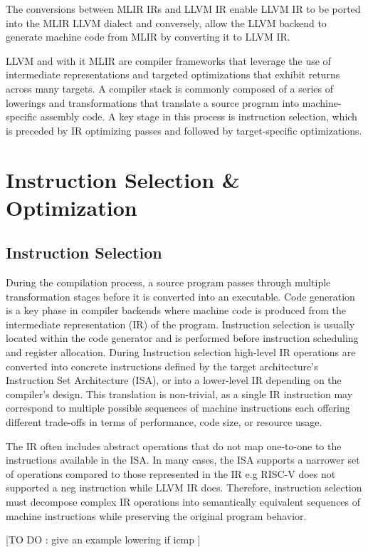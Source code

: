 The conversions between MLIR IRs and LLVM IR enable LLVM IR to be ported into the MLIR LLVM dialect and conversely, allow the LLVM backend to generate machine code from MLIR by converting it to LLVM IR.

LLVM and with it MLIR are compiler frameworks that leverage the use of intermediate representations and targeted optimizations that exhibit returns across many targets.  A compiler stack is commonly composed of a series of lowerings and transformations that translate a source program into machine-specific assembly code. A key stage in this process is instruction selection, which is preceded by IR optimizing passes and followed by target-specific optimizations. 

\section{Instruction Selection \& Optimization}
\subsection {Instruction Selection}
During the compilation process, a source program passes through multiple transformation stages before it is converted into an executable. Code generation is a key phase in compiler backends where machine code is produced from the intermediate representation (IR) of the program. Instruction selection is usually located within the code generator and is performed before instruction scheduling and register allocation. During Instruction selection high-level IR operations are converted into concrete instructions defined by the target architecture’s Instruction Set Architecture (ISA), or into a lower-level IR depending on the compiler's design.
 This translation is non-trivial, as a single IR instruction may correspond to multiple possible sequences of machine instructions each offering different trade-offs in terms
of performance, code size, or resource usage. 

The IR often includes abstract operations that do not map one-to-one to the instructions available in the ISA. In many cases, the ISA supports a narrower set of operations compared to those represented in the IR e.g RISC-V does not supported a neg instruction while LLVM IR does. Therefore, instruction selection must decompose complex IR operations into semantically equivalent sequences of machine instructions while preserving the original program behavior.

[TO DO : give an example lowering if icmp ]

